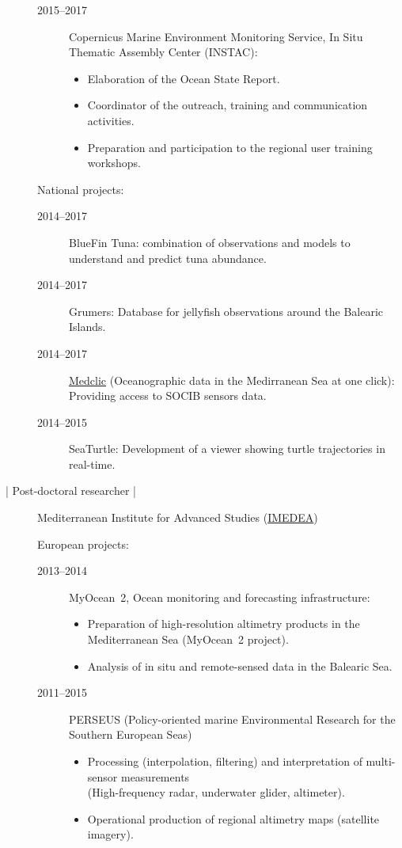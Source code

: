 \documentclass[10pt,a4paper,svgnames]{article}
\begin{document}
\begin{description}
\begin{description}
\item[2015--2017] Copernicus Marine Environment Monitoring Service, In Situ Thematic Assembly Center (INSTAC):
\begin{itemize}
\item Elaboration of the Ocean State Report.
\item Coordinator of the outreach, training and communication activities.
\item Preparation and participation to the regional user training workshops.
\end{itemize}
\end{description}
National projects:
\begin{description}
\item[2014--2017] BlueFin Tuna: combination of observations and models to understand and predict tuna abundance.
\item[2014--2017] Grumers: Database for jellyfish observations around the Balearic Islands. 
\item[2014--2017] \href{http://medclic.es/es/news/research/asimilacion-datos.html}{Medclic} (Oceanographic data in the Medirranean Sea at one click): Providing access to SOCIB sensors data.
\item[2014--2015] SeaTurtle: Development of a viewer showing turtle trajectories in real-time.
\end{description}


\item[\datebox{2013/03--2014/03} | Post-doctoral researcher |] Mediterranean Institute for Advanced Studies (\href{http://imedea.uib-csic.es/}{IMEDEA})

European projects:
\begin{description}
\item[2013--2014] MyOcean~2, Ocean monitoring and forecasting infrastructure:
\begin{itemize}%
\item Preparation of high-resolution altimetry products in the Mediterranean Sea (MyOcean~2 project).
\item Analysis of in situ and remote-sensed data in the Balearic Sea.
\end{itemize}

\item[2011--2015] PERSEUS (Policy-oriented marine Environmental Research for the Southern European Seas)
\begin{itemize}%
\item Processing (interpolation, filtering) and interpretation of multi-sensor measurements\\(High-frequency radar, underwater glider, altimeter).
\item Operational production of regional altimetry maps (satellite imagery).
\end{itemize}
\end{description}



\end{description}
\end{document}
